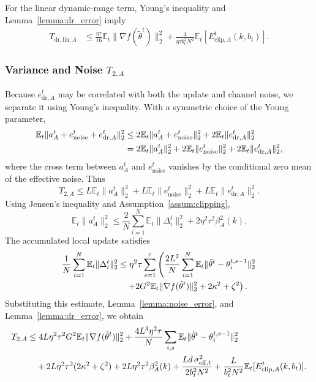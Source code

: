 \documentclass[journal]{IEEEtran}
\begin{document}
For the linear dynamic-range term, Young's inequality and Lemma~\ref{lemma:dr_error} imply
\begin{align}
    \label{eqn:t_dr_lin_bound}
    T_{\mathrm{dr,lin},A}
    &\le
    \frac{\eta\tau}{16}\mathbb{E}_t\|\nabla f(\tilde\theta^t)\|_2^2
    +
    \frac{4}{\eta\tau b_t^2N^2}\mathbb{E}_t[E_{\mathrm{clip},A}^t(k,b_t)].
\end{align}

\subsubsection{Variance and Noise $T_{2,A}$}

Because $e_{\mathrm{dr},A}^t$ may be correlated with both the update and channel noise, we separate it using Young's inequality. With a symmetric choice of the Young parameter,
\begin{align}
    \mathbb{E}_t\|a_A^t+e_{\mathrm{noise}}^t+e_{\mathrm{dr},A}^t\|_2^2
    &\le
    2\mathbb{E}_t\|a_A^t+e_{\mathrm{noise}}^t\|_2^2
    +2\mathbb{E}_t\|e_{\mathrm{dr},A}^t\|_2^2
    \notag\\
    &=2\mathbb{E}_t\|a_A^t\|_2^2
    +2\mathbb{E}_t\|e_{\mathrm{noise}}^t\|_2^2
    +2\mathbb{E}_t\|e_{\mathrm{dr},A}^t\|_2^2,
\end{align}
where the cross term between $a_A^t$ and $e_{\mathrm{noise}}^t$ vanishes by the conditional zero mean of the effective noise. Thus
\begin{equation}
    T_{2,A}
    \le
    L\mathbb{E}_t\|a_A^t\|_2^2
    +L\mathbb{E}_t\|e_{\mathrm{noise}}^t\|_2^2
    +L\mathbb{E}_t\|e_{\mathrm{dr},A}^t\|_2^2.
\end{equation}
Using Jensen's inequality and Assumption~\ref{assum:clipping},
\begin{equation}
    \mathbb{E}_t\|a_A^t\|_2^2
    \le
    \frac{2}{N}\sum_{i=1}^{N}\mathbb{E}_t\|\Delta_i^t\|_2^2
    +2\eta^2\tau^2\beta_A^2(k).
\end{equation}
The accumulated local update satisfies
\begin{align}
    \frac1N\sum_{i=1}^{N}\mathbb{E}_t\|\Delta_i^t\|_2^2
    &\le
    \eta^2\tau\sum_{s=1}^{\tau}
    \left(
    \frac{2L^2}{N}\sum_{i=1}^{N}\mathbb{E}_t\|\tilde\theta^t-\theta_i^{t,s-1}\|_2^2
    \right.
    \notag\\
    &\quad\left.
    +2G^2\mathbb{E}_t\|\nabla f(\tilde\theta^t)\|_2^2
    +2\kappa^2+\zeta^2
    \right).
\end{align}
Substituting this estimate, Lemma~\ref{lemma:noise_error}, and Lemma~\ref{lemma:dr_error}, we obtain
\begin{align}
    \label{eqn:t2_bound_new}
    T_{2,A}
    &\le
    4L\eta^2\tau^2G^2\mathbb{E}_t\|\nabla f(\tilde\theta^t)\|_2^2
    +\frac{4L^3\eta^2\tau}{N}\sum_{i,s}\mathbb{E}_t\|\tilde\theta^t-\theta_i^{t,s-1}\|_2^2
    \notag\\
    &\quad+
    2L\eta^2\tau^2(2\kappa^2+\zeta^2)
    +2L\eta^2\tau^2\beta_A^2(k)
    +\frac{Ld\,\sigma_{\mathrm{eff},t}^2}{2b_t^2N^2}
    +\frac{L}{b_t^2N^2}\mathbb{E}_t[E_{\mathrm{clip},A}^t(k,b_t)].
\end{align}
\end{document}

